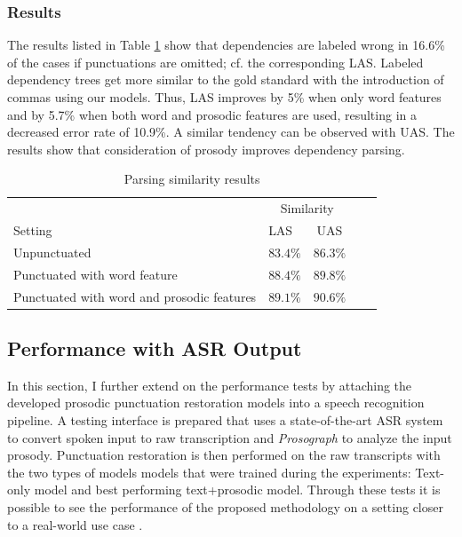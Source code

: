\subsubsection*{Results}

The results listed in Table \ref{parsing} show that dependencies are labeled wrong in 16.6\% of the cases if punctuations are omitted; cf. the corresponding LAS. Labeled dependency trees get more similar to the gold standard with the introduction of commas using our models. Thus, LAS improves by 5\% when only word features and by 5.7\% when both word and prosodic features are used, resulting in a decreased error rate of 10.9\%. A similar tendency can be observed with UAS. The results show that consideration of prosody improves dependency parsing. 

\begin{table}[H]
	\centering
	\begin{tabular}{p{8cm}p{2cm}ccc}
		\toprule
         &  \multicolumn{2}{c}{Similarity}  \\
         Setting   							& LAS   &  UAS  \\
		\midrule
        Unpunctuated 					& $83.4\%$ & $86.3\%$ \\
		Punctuated with word feature	& $88.4\%$ & $89.8\%$ \\
		Punctuated with word and prosodic features  & $89.1\%$ & $90.6\%$ \\
		\bottomrule
	\end{tabular}
	\caption{Parsing similarity results}
	\label{parsing}
\end{table}

\subsection{Performance with ASR Output}
\label{punkProse:experiments:q3}
In this section, I further extend on the performance tests by attaching the developed prosodic punctuation restoration models into a speech recognition pipeline. A testing interface is prepared that uses a state-of-the-art ASR system to convert spoken input to raw transcription and \textit{Prosograph} \citep{prosograph} to analyze the input prosody. Punctuation restoration is then performed on the raw transcripts with the two types of models models that were trained during the experiments: Text-only model and best performing text+prosodic model. Through these tests it is possible to see the performance of the proposed methodology on a setting closer to a real-world use case \citep{punkProse}.

